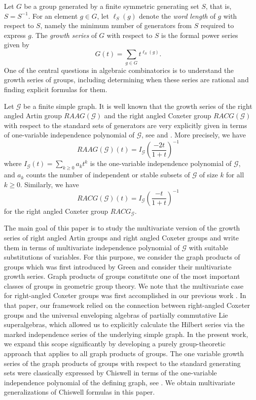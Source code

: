 \documentclass[11pt,reqno]{amsart}
\numberwithin{equation}{section} %
\theoremstyle{definition}
\theoremstyle{remark}
\numberwithin{equation}{section}
\begin{document}
 Let \(G\) be a group generated by a finite symmetric generating set \(S\), that is,
\(S=S^{-1}\). For an element \(g\in G\), let
$\ell_S(g)$
denote the \emph{word length} of \(g\) with respect to \(S\), namely the minimum
number of generators from \(S\) required to express \(g\). The
\emph{growth series} of \(G\) with respect to \(S\) is the formal power series given by
\[
G(t)=\sum_{g\in G} t^{\ell_S(g)}.
\]
One of the central questions in algebraic combinatorics is to understand the growth series of groups, including determining when these series are rational and finding explicit formulas for them.

Let $\mathcal{G}$ be a finite simple graph. It is well known that the growth series of the right angled Artin group $RAAG({\mathcal{G}})$ and the right angled Coxeter group $RACG({\mathcal{G}})$ with respect to the standard sets of generators are very explicitly given in terms of one-variable independence polynomial of $\mathcal{G}$, see \cite[Prop. 17.4.2]{Davis} and \cite{Chiswell94, Amri-Athreya}. More precisely, we have 
$$RAAG(\mathcal{G})(t) = I_{\mathcal{G}}\left(\frac{-2t}{1+t}\right)^{-1} $$
where $I_{\mathcal{G}}(t)=\sum_{k\ge 0}a_kt^k$ is the one-variable independence polynomial of $\mathcal{G}$, and $a_k$ counts the number of independent or stable subsets of $\mathcal{G}$ of size $k$ for all $k\ge 0.$
Similarly, we have 
\[
RACG({\mathcal{G}})(t)
=I_{\mathcal{G}}\!\left(\dfrac{-t}{1+t}\right)^{-1}
\] for the right angled Coxeter group $RACG_{\mathcal{G}}$.

The main goal of this paper is to study the multivariate version of the growth series of right angled Artin groups and right angled Coxeter groups and write them in terms of multivariate independence  polynomial of
$\mathcal{G}$ with suitable substitutions of variables. For this purpose, we consider the graph products of groups which was first introduced by  Green \cite{Green} and consider their  multivariate  growth series. Graph products of groups constitute one of the most important classes of groups in geometric group theory. 
We note that the multivariate case for right-angled Coxeter groups was first accomplished in our previous  work \cite{CDV}. In that paper, our framework relied on the connection between right-angled Coxeter groups and the universal enveloping algebras of partially commutative Lie superalgebras, which allowed us to explicitly calculate the Hilbert series via the marked independence series of the underlying simple graph. In the present work, we expand this scope significantly by developing a purely group-theoretic approach that applies to all graph products of groups.  The one variable growth series of the graph products of groups with respect to the standard generating sets were classically expressed by Chiswell in terms of the one-variable independence polynomial of the defining graph, see \cite{Chiswell94}. We obtain multivariate generalizations of Chiswell formulas in this paper. 
\end{document}
